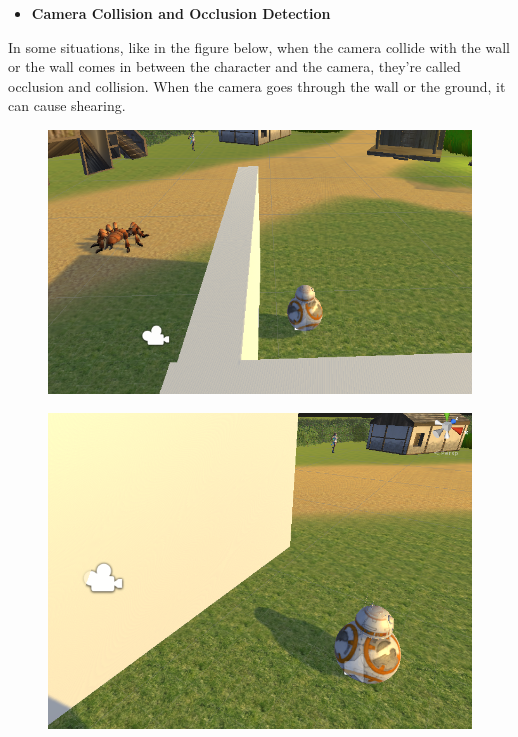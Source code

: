 \documentclass[a4paper, 13pt]{extarticle}
\begin{document}
 	  \begin{itemize}
	 	\item \bfseries Camera Collision and Occlusion Detection  	 	
 	 \end{itemize}
 	 In some situations, like in the figure below, when the camera collide with the wall or the wall comes in between the character and the camera, they're called occlusion and collision. When the camera goes through the wall or the ground, it can cause shearing.
 	 \begin{figure}[h]
 	 	\centering
 	 	\begin{minipage}{.4\textwidth}
 	 		\centering
 	 		\includegraphics[width=1\linewidth]{intructions/camera_cover.png}
 	 		\centering
 	 		\label{fig:test8}
 	 	\end{minipage}
  	\begin{minipage}{.4\textwidth}
  		\centering
  		\includegraphics[width=1\linewidth]{intructions/camera_collide.png}
  		\centering
  		\label{fig:test9}
  	\end{minipage}
 	 \end{figure}
\end{document}
